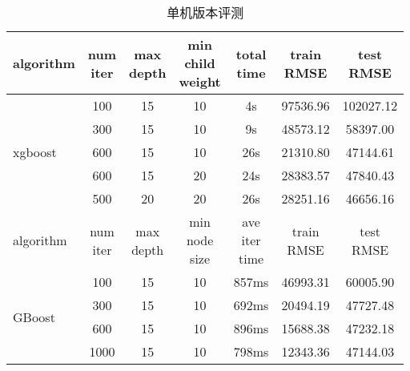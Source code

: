 \documentclass[a4paper,11pt,         %
               ]{article}
\begin{document}
\begin{table}%
\centering
\caption{单机版本评测}
\label{tb:stand_along}
\begin{tabular}{l|c|c|c|c|c|c}
\hline
algorithm & \tabincell{c}{num\\ iter} & \tabincell{c}{max\\ depth} & \tabincell{c}{min\\ child\\ weight\\} & \tabincell{c}{total\\ time} & \tabincell{c}{train\\ RMSE} & \tabincell{c}{test\\ RMSE} \\
\hline
\multirow{5}{*}{xgboost} 	&	100		&	15	&	10	&	4s	&	97536.96	&	102027.12	\\
							&	300		&	15	&	10	&	9s	&	48573.12	&	58397.00	\\
							&	600		&	15	&	10	&	26s	&	21310.80	&	47144.61	\\
							&	600		&	15	&	20	&	24s	&	28383.57	&	47840.43	\\
							&	500		&	20	&	20	&	26s	&	28251.16	&	46656.16	\\
\hline
\hline
algorithm & \tabincell{c}{num\\ iter} & \tabincell{c}{max\\ depth} & \tabincell{c}{min\\ node\\ size\\} & \tabincell{c}{ave\\ iter\\ time} & \tabincell{c}{train\\ RMSE} & \tabincell{c}{test\\ RMSE} \\
\hline
\multirow{4}{*}{GBoost}		&	100		&	15	&	10	&	857ms	&	46993.31	&	60005.90	\\
							&	300		&	15	&	10	&	692ms	&	20494.19	&	47727.48 	\\
							&	600		&	15	&	10	&	896ms	&	15688.38	&	47232.18	\\
							&	1000	&	15	&	10	&	798ms	&	12343.36	&	47144.03	\\

\hline

\end{tabular}
\end{table}
\end{document}
